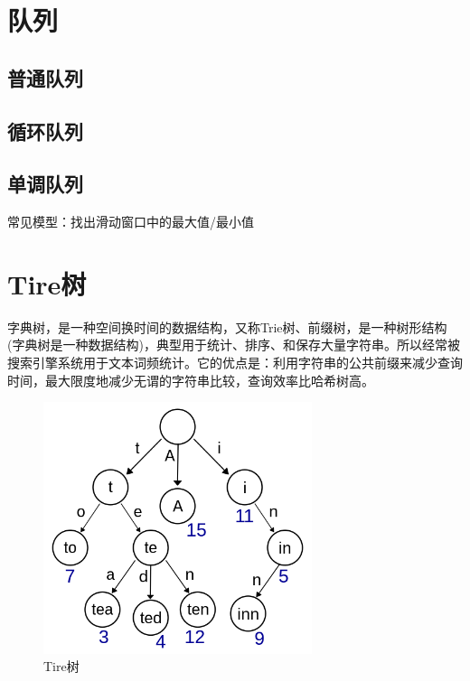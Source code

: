 \section{队列}
\subsection{普通队列}


\subsection{循环队列}


\subsection{单调队列}
常见模型：找出滑动窗口中的最大值/最小值


\section{Tire树}
字典树，是一种空间换时间的数据结构，又称Trie树、前缀树，是一种树形结构(字典树是一种数据结构)，典型用于统计、排序、和保存大量字符串。所以经常被搜索引擎系统用于文本词频统计。它的优点是：利用字符串的公共前缀来减少查询时间，最大限度地减少无谓的字符串比较，查询效率比哈希树高。
\begin{figure}[H]
\centering
\includegraphics[width=0.7\textwidth]{images_content/5.png}
\caption{Tire树}
\end{figure}

